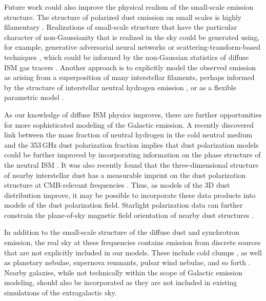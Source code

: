 \documentclass[twocolumn]{aastex631}
\begin{document}
Future work could also improve the physical realism of the small-scale emission structure. The structure of polarized dust emission on small scales is highly filamentary \citep[e.g.,][]{Clark:2015, Halal:2024b}. Realizations of small-scale structure that have the particular character of non-Gaussianity that is realized in the sky could be generated using, for example, generative adversarial neural networks \citep{Krachmalnicoff:2021, Yao:2024} or scattering-transform-based techniques \citep{Regaldo-SaintBlancard:2020, Delouis:2022, Mousset:2024}, which could be informed by the non-Gaussian statistics of diffuse ISM gas tracers \citep{Lei:2023}. Another approach is to explicitly model the observed emission as arising from a superposition of many interstellar filaments, perhaps informed by the structure of interstellar neutral hydrogen emission \citep{Clark:2019}, or as a flexible parametric model \citep{Hervias-Caimapo:2022, Hervias-Caimapo:2024}.

As our knowledge of diffuse ISM physics improves, there are further opportunities for more sophisticated modeling of the Galactic emission. A recently discovered link between the mass fraction of neutral hydrogen in the cold neutral medium and the 353\,GHz dust polarization fraction implies that dust polarization models could be further improved by incorporating information on the phase structure of the neutral ISM \citep{Lei:2024}. It was also recently found that the three-dimensional structure of nearby interstellar dust has a measurable imprint on the dust polarization structure at CMB-relevant frequencies \citep{Halal:2024a}. Thus, as models of the 3D dust distribution \citep[e.g.,][]{Edenhofer:2024, Zhang:2024} improve, it may be possible to incorporate these data products into models of the dust polarization field. Starlight polarization data can further constrain the plane-of-sky magnetic field orientation of nearby dust structures \citep[e.g.,][]{Pelgrims:2024, Panopoulou:2025}.  

In addition to the small-scale structure of the diffuse dust and synchrotron emission, the real sky at these frequencies contains emission from discrete sources that are not explicitly included in our models. These include cold clumps \citep{Clancy:2023}, as well as planetary nebulae, supernova remnants, pulsar wind nebulae, and so forth \citep{Naess:2020, Guan:2021}. Nearby galaxies, while not technically within the scope of Galactic emission modeling, should also be incorporated as they are not included in existing simulations of the extragalactic sky.
\end{document}
